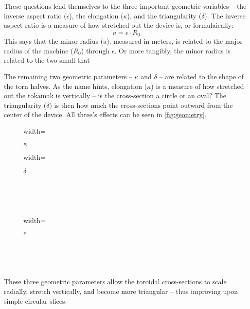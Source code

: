 These questions lend themselves to the three important geometric variables -- the inverse aspect ratio ($\epsilon$), the elongation ($\kappa$), and the triangularity ($\delta$). The inverse aspect ratio is a measure of how stretched out the device is, or formulaically:
\begin{equation}
	\label{eq:a}
	a = \epsilon \cdot R_0
\end{equation}
This says that the minor radius (a), measured in meters, is related to the major radius of the machine ($R_0$) through $\epsilon$. Or more tangibly, the minor radius is related to the two small  that  

The remaining two geometric parameters -- $\kappa$ and $\delta$ -- are related to the shape of the torn halves. As the name hints, elongation ($\kappa$) is a measure of how stretched out the tokamak is vertically -- is the cross-section a circle or an oval? The triangularity ($\delta$) is then how much the cross-sections point outward from the center of the device. All three's effects can be seen in \cref{fig:geometry}. 

\begin{figure*}[h]
    \centering
    \hfill 
    \begin{subfigure}[t]{0.45\textwidth}
        \centering
		\begin{adjustbox}{width=\textwidth}
			\Large
			
		\end{adjustbox}
        \caption{$\kappa$}
    \end{subfigure}
    \hfill
    \begin{subfigure}[t]{0.45\textwidth}
        \centering
		\begin{adjustbox}{width=\textwidth}
			\Large
			
		\end{adjustbox}
        \caption{$\delta$}
    \end{subfigure}
    \hfill \hfill ~\\ ~\\ ~\\
    \begin{subfigure}[t]{0.6\textwidth}
        \centering
		\begin{adjustbox}{width=\textwidth}
			\large
			
		\end{adjustbox}
        \caption{$\epsilon$}
    \end{subfigure} ~\\ ~\\
    \caption{Geometric Parameters} ~\\
    \small These three geometric parameters allow the toroidal cross-sections to scale radially, stretch vertically, and become more triangular -- thus improving upon simple circular slices.
    \label{fig:geometry}
\end{figure*}

